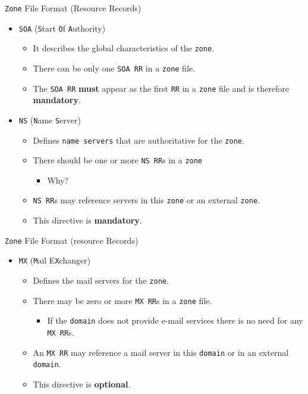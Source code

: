 \documentclass[xcolor=table]{beamer}
\begin{document}
\begin{frame}{\texttt{Zone} File Format (Resource Records)}
  \begin{itemize}
    \item \texttt{SOA} (\texttt{S}tart \texttt{O}f \texttt{A}uthority)
       \begin{itemize}
         \item It describes the global characteristics of the \texttt{zone}.
         \item There can be only one \texttt{SOA RR} in a \texttt{zone} file. 
         \item The \texttt{SOA RR} \textbf{must} appear as the first \texttt{RR} in a \texttt{zone} file and is therefore \textbf{mandatory}.
       \end{itemize}
     \item \texttt{NS} (\texttt{N}ame \texttt{S}erver)
       \begin{itemize}
         \item Defines \texttt{name servers} that are authoritative for the \texttt{zone}. 
         \item There should be one or more \texttt{NS RR}s in a \texttt{zone} 
           \begin{itemize}
             \item Why?
           \end{itemize} 
         \item \texttt{NS RR}s may reference servers in this \texttt{zone} or an external \texttt{zone}. 
         \item This directive is \textbf{mandatory}.
       \end{itemize}
  \end{itemize}
\end{frame}

\begin{frame}{\texttt{Zone} File Format (resource Records)}
  \begin{itemize}
    \item \texttt{MX} (\texttt{M}ail E\texttt{X}changer)
       \begin{itemize}
          \item Defines the mail servers for the \texttt{zone}. 
          \item There may be zero or more \texttt{MX RR}s in a \texttt{zone} file.
            \begin{itemize}
              \item If the \texttt{domain} does not provide e-mail services there is no need for any \texttt{MX RR}s.
            \end{itemize} 
         \item An \texttt{MX RR} may reference a mail server in this \texttt{domain} or in an external \texttt{domain}. 
         \item This directive is \textbf{optional}.
       \end{itemize}
  \end{itemize}
\end{frame}
\end{document}
